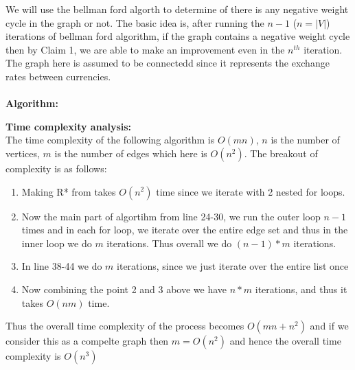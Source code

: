 \documentclass{article}
\begin{document}
We will use the bellman ford algorth to determine of there is any negative weight cycle in the graph or not. The basic idea is, after running the $n-1$ ($n = |V|$) iterations of bellman ford algorithm, if the graph contains a negative weight cycle then by Claim 1, we are able to make an improvement even in the $n^{th}$ iteration. The graph here is assumed to be connectedd since it represents the exchange rates between currencies.
\\\\
\textbf{Algorithm:}

\textbf{Time complexity analysis:}\\
The time complexity of the following algorithm is $O(mn)$, $n$ is the number of vertices, $m$ is the number of edges which here is $O(n^2)$. The breakout of complexity is as follows:
\begin{enumerate}
    \item Making R* from takes $O(n^2)$ time since we iterate with 2 nested for loops.
    \item Now the main part of algortihm from line 24-30, we run the outer loop $n-1$ times and in each for loop, we iterate over the entire edge set and thus in the inner loop we do $m$ iterations. Thus overall we do $(n-1)*m$ iterations.
    \item In line 38-44 we do $m$ iterations, since we just iterate over the entire list once
    \item Now combining the point 2 and 3 above we have $n*m$ iterations, and thus it takes $O(nm)$ time.
\end{enumerate}
Thus the overall time complexity of the process becomes $O(mn + n^2)$ and if we consider this as a compelte graph then $m = O(n^2)$ and hence the overall time complexity is $O(n^3)$
\end{document}
